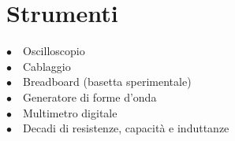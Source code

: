 

\section{Strumenti}

$\bullet \quad$Oscilloscopio \\
$\bullet \quad$Cablaggio\\
$\bullet \quad$Breadboard (basetta sperimentale)\\
$\bullet \quad$Generatore di forme d'onda\\
$\bullet \quad$Multimetro digitale\\
$\bullet \quad$Decadi di resistenze, capacità e induttanze\\